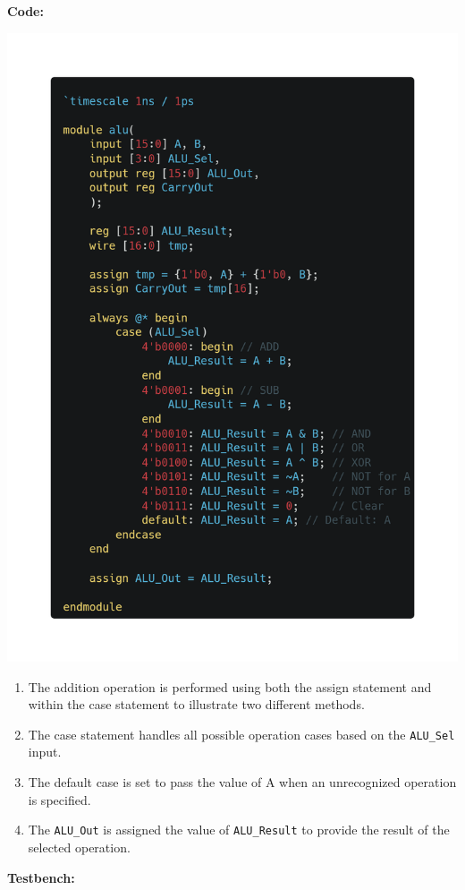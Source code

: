 \documentclass[12pt]{article}
\begin{document}
\pagebreak
\textbf{Code:}
\begin{center}
    \includegraphics[scale=0.25]{images/alu.png}
\end{center}
\begin{enumerate}
    \item The addition operation is performed using both the assign statement and within the case statement to illustrate two different methods.
    \item The case statement handles all possible operation cases based on the \verb|ALU_Sel| input.
    \item The default case is set to pass the value of A when an unrecognized operation is specified.
    \item The \verb|ALU_Out| is assigned the value of \verb|ALU_Result| to provide the result of the selected operation.
\end{enumerate}
\pagebreak
\textbf{Testbench:}
\end{document}
